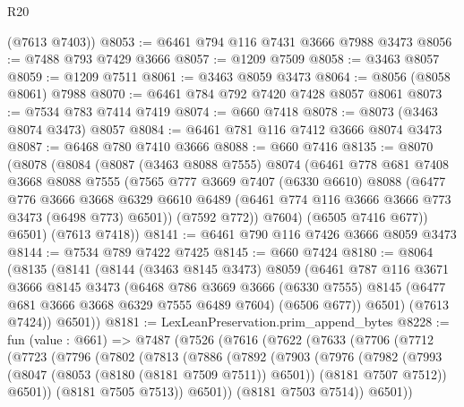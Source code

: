 \begin{lexlean}{R20}
\begin{coremodule}
      (@7613 @7403))
@8053 := @6461 @794 @116 @7431 @3666 @7988 @3473
@8056 := @7488 @793 @7429 @3666
@8057 := @1209 @7509
@8058 := @3463 @8057
@8059 := @1209 @7511
@8061 := @3463 @8059 @3473
@8064 := @8056 (@8058 @8061) @7988
@8070 := @6461 @784 @792 @7420 @7428 @8057 @8061
@8073 := @7534 @783 @7414 @7419
@8074 := @660 @7418
@8078 := @8073 (@3463 @8074 @3473) @8057
@8084 := @6461 @781 @116 @7412 @3666 @8074 @3473
@8087 := @6468 @780 @7410 @3666
@8088 := @660 @7416
@8135 := @8070
    (@8078
      (@8084
        (@8087
          (@3463 @8088 @7555)
          @8074
          (@6461
            @778
            @681
            @7408
            @3668
            @8088
            @7555
            (@7565
              @777
              @3669
              @7407
              (@6330 @6610)
              @8088
              (@6477
                @776
                @3666
                @3668
                @6329
                @6610
                @6489
                (@6461 @774 @116 @3666 @3666 @773 @3473 (@6498 @773) @6501))
              (@7592 @772))
            @7604)
          (@6505 @7416 @677))
        @6501)
      (@7613 @7418))
@8141 := @6461 @790 @116 @7426 @3666 @8059 @3473
@8144 := @7534 @789 @7422 @7425
@8145 := @660 @7424
@8180 := @8064
    (@8135
      (@8141
        (@8144
          (@3463 @8145 @3473)
          @8059
          (@6461
            @787
            @116
            @3671
            @3666
            @8145
            @3473
            (@6468
              @786
              @3669
              @3666
              (@6330 @7555)
              @8145
              (@6477 @681 @3666 @3668 @6329 @7555 @6489 @7604)
              (@6506 @677))
            @6501)
          (@7613 @7424))
        @6501))
@8181 := LexLeanPreservation.prim_append_bytes
@8228 := fun (value : @661) =>
  @7487
    (@7526
      (@7616
        (@7622
          (@7633
            (@7706
              (@7712
                (@7723
                  (@7796
                    (@7802
                      (@7813
                        (@7886
                          (@7892
                            (@7903
                              (@7976
                                (@7982
                                  (@7993
                                    (@8047 (@8053 (@8180 (@8181 @7509 @7511)) @6501))
                                    (@8181 @7507 @7512))
                                  @6501))
                              (@8181 @7505 @7513))
                            @6501))
                        (@8181 @7503 @7514))
                      @6501))

\end{coremodule}
\end{lexlean}
